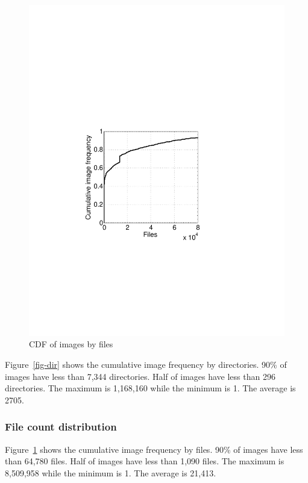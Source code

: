 \begin{figure}
\begin{minipage}{0.23\textwidth}
		\includegraphics[width=1\textwidth]{graphs/file.pdf}
		\caption{CDF of images by files}
		\label{fig-file}
	\end{minipage}
\end{figure}

Figure~\ref{fig-dir} shows the cumulative image frequency by directories. 90\% of images have less than 7,344 directories. Half of images have less than 296 directories. The maximum is 1,168,160 while the minimum is 1. The average is 2705. 

\subsubsection{File count distribution}

Figure~\ref{fig-file} shows the cumulative image frequency by files. 90\% of images have less than 64,780 files. Half of images have less than 1,090 files. The maximum is 8,509,958 while the minimum is 1. The average is 21,413. 

